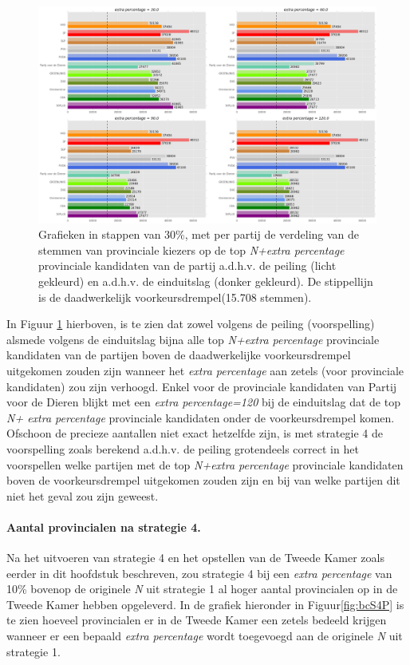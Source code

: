   
\begin{figure}[H]

	\includegraphics[width=\linewidth]	{stemmen_op_provincialen_topNextrapercentage_uitslag.png}

			\caption{Grafieken in stappen van 30\%, met per partij de verdeling van de stemmen van provinciale kiezers op de top \textit{N+extra percentage} provinciale kandidaten van de partij a.d.h.v. de peiling (licht gekleurd) en a.d.h.v. de einduitslag (donker gekleurd). De stippellijn is de daadwerkelijk voorkeursdrempel(15.708 stemmen).}

\label{fig:stemmenS4P}
\end{figure}

In Figuur \ref{fig:stemmenS4P} hierboven, is te zien dat zowel volgens de peiling (voorspelling) alsmede volgens de einduitslag bijna alle top \textit{N+extra percentage} provinciale kandidaten van de partijen boven de daadwerkelijke voorkeursdrempel uitgekomen zouden zijn wanneer het \textit{extra percentage} aan zetels (voor provinciale kandidaten) zou zijn verhoogd. Enkel voor de provinciale kandidaten van Partij voor de Dieren blijkt met een \textit{extra percentage=120} bij de einduitslag dat de top \textit{N+ extra percentage} provinciale kandidaten onder de voorkeursdrempel komen. Ofschoon de precieze aantallen niet exact hetzelfde zijn, is met strategie 4 de voorspelling zoals berekend a.d.h.v. de peiling grotendeels correct in het voorspellen welke partijen met de top \textit{N+extra percentage} provinciale kandidaten boven de voorkeursdrempel uitgekomen zouden zijn en bij van welke partijen dit niet het geval zou zijn geweest.



\paragraph{Aantal provincialen na strategie 4.}
Na het uitvoeren van strategie 4 en het opstellen van de Tweede Kamer zoals eerder in dit hoofdstuk beschreven, zou strategie 4 bij een \textit{extra percentage} van 10\% bovenop de originele \textit{N} uit strategie 1 al hoger aantal provincialen op in de Tweede Kamer hebben opgeleverd. In de grafiek hieronder in Figuur\ref{fig:bcS4P} is te zien hoeveel provincialen er in de Tweede Kamer een zetels bedeeld krijgen wanneer er een bepaald \textit{extra percentage} wordt toegevoegd aan de originele \textit{N} uit strategie 1.

